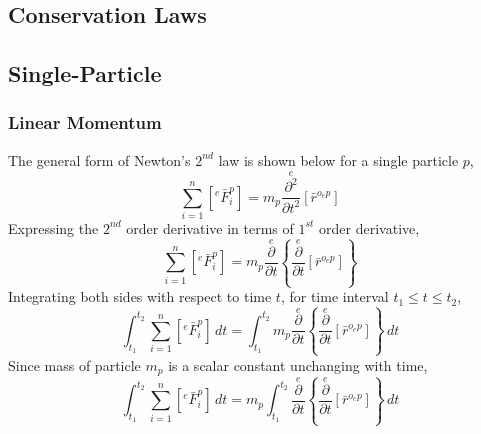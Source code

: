 \documentclass[class=report, 12pt, crop=false]{standalone}
\begin{document}
\begin{center}
\chapter{Conservation Laws}
\begin{comment}
\end{comment}
\section{Single-Particle}
\begin{comment}
\end{comment}
\subsection{Linear Momentum}
\begin{comment}
\end{comment}
The general form of Newton's $2^{nd}$ law is shown below for a single particle $p$,
$$\sum^{n}_{i = 1}\left[{}^{e}\bar{F}^{p}_{i}\right] = m_{p}\overset{e}{\frac{\partial^{2}}{\partial t^{2}}}[\bar{r}^{o_{e}p}]$$
Expressing the $2^{nd}$ order derivative in terms of $1^{st}$ order derivative,
$$\sum^{n}_{i = 1}\left[{}^{e}\bar{F}^{p}_{i}\right] = m_{p}\overset{e}{\frac{\partial}{\partial t}}\left\{\overset{e}{\frac{\partial}{\partial t}}[\bar{r}^{o_{e}p}]\right\}$$
Integrating both sides with respect to time $t$, for time interval $t_{1} \leq t \leq t_{2}$,
$$\int^{t_{2}}_{t_{1}} \sum^{n}_{i = 1}\left[{}^{e}\bar{F}^{p}_{i}\right] \,dt = \int^{t_{2}}_{t_{1}} m_{p}\overset{e}{\frac{\partial}{\partial t}}\left\{\overset{e}{\frac{\partial}{\partial t}}[\bar{r}^{o_{e}p}]\right\} \,dt$$
Since mass of particle $m_{p}$ is a scalar constant unchanging with time,
$$\int^{t_{2}}_{t_{1}} \sum^{n}_{i = 1}\left[{}^{e}\bar{F}^{p}_{i}\right] \,dt = m_{p}\int^{t_{2}}_{t_{1}} \overset{e}{\frac{\partial}{\partial t}}\left\{\overset{e}{\frac{\partial}{\partial t}}[\bar{r}^{o_{e}p}]\right\} \,dt$$


\end{center}
\end{document}
